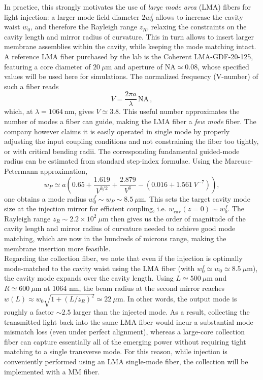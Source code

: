 In practice, this strongly motivates the use of \emph{large mode area} (LMA) fibers for light injection: a larger mode field diameter $2w_0^f$ allows to increase the cavity waist $w_0$, and therefore the Rayleigh range $z_R$, relaxing the constraints on the cavity length and mirror radius of curvature. This in turn allows to insert larger membrane assemblies within the cavity, while keeping the mode matching intact. A reference LMA fiber purchased by the lab is the Coherent LMA-GDF-20-125, featuring a core diameter of $20~\mu\mathrm{m}$ and aperture of $\mathrm{NA}\simeq 0.08$, whose specified values will be used here for simulations. The normalized frequency (V-number) of such a fiber reads
\begin{equation}
V=\frac{2\pi a}{\lambda}\,\mathrm{NA}\,,
\end{equation}
which, at $\lambda = 1064~\mathrm{nm}$, gives $V\simeq 3.8$. This useful number approximates the number of modes a fiber can guide, making the LMA fiber a \textit{few mode} fiber. The company however claims it is easily operated in single mode by properly adjusting the input coupling conditions and not constraining the fiber too tightly, or with critical bending radii. The corresponding fundamental guided-mode radius can be estimated from standard step-index formulae. Using the Marcuse-Petermann approximation,
\begin{equation}
w_P \simeq a\!\left(0.65+\frac{1.619}{V^{3/2}}+\frac{2.879}{V^{6}}-\left(0.016+1.561\,V^{-7}\right)\right),
\end{equation}
one obtains a mode radius $w_0^f \sim w_P \sim 8.5~\mu\mathrm{m}$. This sets the target cavity mode size at the injection mirror for efficient coupling, i.e. $w_\mathrm{cav}(z\!=\!0)\sim w_0^f$. The Rayleigh range $z_R \sim 2.2\times 10^{2}~\mu\mathrm{m}$ then gives us the order of magnitude of the cavity length and mirror radius of curvature needed to achieve good mode matching, which are now in the hundreds of microns range, making the membrane insertion more feasible. \\

Regarding the collection fiber, we note that even if the injection is optimally mode-matched to the cavity waist using the LMA fiber (with $w_0^{f}\simeq w_0 \simeq 8.5~\mu\mathrm{m}$), the cavity mode expands over the cavity length. Using $L\simeq 500~\mu\mathrm{m}$ and $R\simeq 600~\mu\mathrm{m}$ at 1064 nm, the beam radius at the second mirror reaches $w(L)\approx w_0\sqrt{1+(L/z_R)^2}\simeq 22~\mu\mathrm{m}$. In other words, the output mode is roughly a factor $\sim 2.5$ larger than the injected mode. As a result, collecting the transmitted light back into the same LMA fiber would incur a substantial mode-mismatch loss (even under perfect alignment), whereas a large-core collection fiber can capture essentially all of the emerging power without requiring tight matching to a single transverse mode. For this reason, while injection is conveniently performed using an LMA single-mode fiber, the collection will be implemented with a MM fiber. \\


